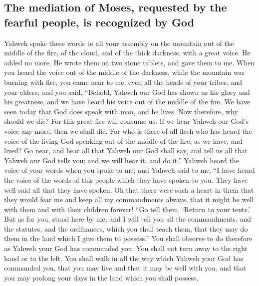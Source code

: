 \hypertarget{the-mediation-of-moses-requested-by-the-fearful-people-is-recognized-by-god}{%
\subsection{The mediation of Moses, requested by the fearful people, is
recognized by
God}\label{the-mediation-of-moses-requested-by-the-fearful-people-is-recognized-by-god}}

 Yahweh spoke these words to all your assembly on the
mountain out of the middle of the fire, of the cloud, and of the thick
darkness, with a great voice. He added no more. He wrote them on two
stone tablets, and gave them to me.  When you heard the
voice out of the middle of the darkness, while the mountain was burning
with fire, you came near to me, even all the heads of your tribes, and
your elders;  and you said, ``Behold, Yahweh our God has
shown us his glory and his greatness, and we have heard his voice out of
the middle of the fire. We have seen today that God does speak with man,
and he lives.  Now therefore, why should we die? For this
great fire will consume us. If we hear Yahweh our God's voice any more,
then we shall die.  For who is there of all flesh who has
heard the voice of the living God speaking out of the middle of the
fire, as we have, and lived?  Go near, and hear all that
Yahweh our God shall say, and tell us all that Yahweh our God tells you;
and we will hear it, and do it.''  Yahweh heard the voice
of your words when you spoke to me; and Yahweh said to me, ``I have
heard the voice of the words of this people which they have spoken to
you. They have well said all that they have spoken.  Oh
that there were such a heart in them that they would fear me and keep
all my commandments always, that it might be well with them and with
their children forever!  ``Go tell them, `Return to your
tents.'  But as for you, stand here by me, and I will
tell you all the commandments, and the statutes, and the ordinances,
which you shall teach them, that they may do them in the land which I
give them to possess.''  You shall observe to do
therefore as Yahweh your God has commanded you. You shall not turn away
to the right hand or to the left.  You shall walk in all
the way which Yahweh your God has commanded you, that you may live and
that it may be well with you, and that you may prolong your days in the
land which you shall possess.

